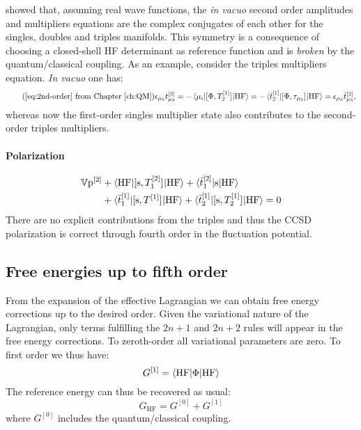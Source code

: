 \citeauthor{Koch1997-nm} showed that, assuming real wave functions, the
\emph{in vacuo} second order amplitudes and multipliers equations are
the complex conjugates of each other for the singles, doubles and
triples manifolds.\autocite{Koch1997-nm, Helgaker2000-tz,
Shavitt2009-mr}
This symmetry is a consequence of choosing a closed-shell \acrshort*{HF}
determinant as reference function\autocite{Shavitt2009-mr} and is
\emph{broken} by the quantum/classical coupling.
As an example, consider the triples multipliers equation. \emph{In vacuo}
one has:
\begin{equation}\tag{\ref{eq:2nd-order} from Chapter \ref{ch:QM}}
  \denom{\mu_3}\tamp{\mu_3}^{[2]}
  = - \braket{\mu_i | \commutator{\Phi}{T_2^{[1]}} | \mathrm{HF}}
  = - \braket{\tbar{2}^{[1]} | \commutator{\Phi}{\cluster{\mu_3}} |
  \mathrm{HF}}
  = \denom{\mu_3}\tbar{\mu_3}^{[2]},
\end{equation}
whereas now the first-order singles multiplier state also contributes to
the second-order triples multipliers.

\paragraph*{Polarization}
\begin{equation}\label{eq:2nd-order-pol}
  \begin{aligned}
  \mathbb{V}\mathrm{p}^{[2]} &+
  \braket{\mathrm{HF} | [ \mathrm{s}, T_1^{[2]} ]^{}| \mathrm{HF}}
  + \braket{\bar{t}_{1}^{[2]} | \mathrm{s} | \mathrm{HF} } \\
  &+ \braket{\bar{t}_{1}^{[1]} | [ \mathrm{s}, T^{[1]} ]^{} | \mathrm{HF}}
  + \braket{\bar{t}_{2}^{[1]} | [ \mathrm{s}, T_2^{[1]} ]^{} | \mathrm{HF}}
  = 0
  \end{aligned}
\end{equation}
There are no explicit contributions from the triples and thus the
\acrshort*{CCSD} polarization is correct through fourth order in the
fluctuation potential.

\subsection{Free energies up to fifth order}\label{sec:energies-pt}

From the expansion of the effective Lagrangian we can obtain free energy
corrections up to the desired order. Given the variational nature of the
Lagrangian, only terms fulfilling the $2n+1$ and $2n+2$ rules will
appear in the free energy corrections.
To zeroth-order all variational parameters are zero. To first order we
thus have:
\begin{equation}\label{eq:first-order-G}
  G^{[1]} = \braket{\mathrm{HF} | \Phi | \mathrm{HF}}
\end{equation}
The reference energy can thus be recovered as usual:
\begin{equation}
  G_\mathrm{HF} = G^{[0]} + G^{[1]}
\end{equation}
where $G^{[0]}$ includes the quantum/classical coupling.

